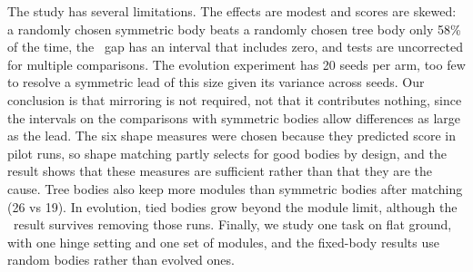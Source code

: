 The study has several limitations. The effects are modest and scores are skewed: a randomly chosen symmetric body beats a randomly chosen tree body only 58\% of the time, the \dann\ gap has an interval that includes zero, and tests are uncorrected for multiple comparisons. The evolution experiment has 20 seeds per arm, too few to resolve a symmetric lead of this size given its variance across seeds. Our conclusion is that mirroring is not required, not that it contributes nothing, since the intervals on the comparisons with symmetric bodies allow differences as large as the lead. The six shape measures were chosen because they predicted score in pilot runs, so shape matching partly selects for good bodies by design, and the result shows that these measures are sufficient rather than that they are the cause. Tree bodies also keep more modules than symmetric bodies after matching (26 vs 19). In evolution, tied bodies grow beyond the module limit, although the \bb\ result survives removing those runs. Finally, we study one task on flat ground, with one hinge setting and one set of modules, and the fixed-body results use random bodies rather than evolved ones.
